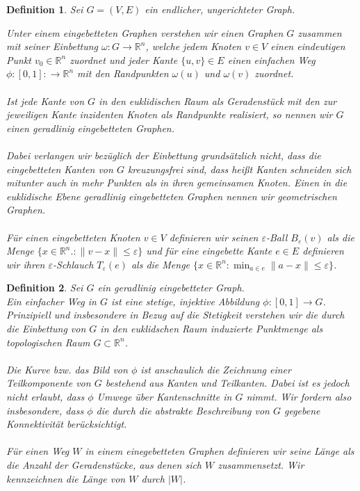 \documentclass[a4paper, 12pt, twoside]{article}
\theoremstyle{Format1} %
\newtheorem{Def}{Definition}[section]       %
\begin{document}
\begin{Def}
	Sei $G=(V,E)$ ein endlicher, ungerichteter Graph.

	Unter einem \textit{eingebetteten Graphen} verstehen wir einen Graphen $G$
	zusammen mit seiner \textit{Einbettung} $\omega: G \to \mathbb{R}^n$, welche
	jedem Knoten $v \in V$ einen eindeutigen Punkt $v_0 \in \mathbb{R}^n$ zuordnet und jeder Kante $\{u,v\} \in E$
	einen einfachen Weg $\phi: [0,1]: \to \mathbb{R}^n$ mit den Randpunkten $\omega(u)$ und $\omega(v)$ zuordnet.
	\\
	\\
	Ist jede Kante von $G$ in den euklidischen Raum als Geradenstück mit den zur jeweiligen Kante inzidenten Knoten als Randpunkte realisiert, so
	nennen wir $G$ einen \textit{geradlinig eingebetteten Graphen}.
	\\
	\\
	Dabei verlangen wir bezüglich der Einbettung grundsätzlich nicht, dass die eingebetteten Kanten von $G$ \textit{kreuzungsfrei} sind,
	dass heißt Kanten schneiden sich mitunter auch in mehr Punkten als in ihren gemeinsamen Knoten.
	Einen in die euklidische Ebene geradlinig eingebetteten Graphen nennen wir \textit{geometrischen Graphen}.
	\\
	\\
	Für einen eingebetteten Knoten $v \in V$ definieren wir seinen \textit{$\varepsilon$-Ball} $B_{\varepsilon}(v)$ als die Menge
	$\{x \in \mathbb{R}^n.: \|v-x\| \leq \varepsilon\}$
	und für eine eingebette Kante $e \in E$ definieren wir ihren \textit{$\varepsilon$-Schlauch} $T_{\varepsilon}(e)$ als die Menge
	$\{x \in \mathbb{R}^n: \min_{a \in e}\|a-x\| \leq \varepsilon\}$.
\end{Def}

\begin{Def}
	Sei $G$ ein geradlinig eingebetteter Graph.
	\\
	Ein \textit{einfacher Weg in $G$} ist eine stetige, injektive Abbildung $\phi: [0,1] \to G$.
	Prinzipiell und insbesondere in Bezug auf die Stetigkeit verstehen wir die durch die Einbettung von
	$G$ in den euklidschen Raum induzierte Punktmenge als topologischen Raum $G \subset \mathbb{R}^n$.
	\\
	\\
	Die Kurve bzw. das Bild von $\phi$ ist anschaulich die Zeichnung einer Teilkomponente von $G$ bestehend aus
	Kanten und Teilkanten. Dabei ist es jedoch nicht erlaubt, dass $\phi$ Umwege über Kantenschnitte in $G$ nimmt.
	Wir fordern also insbesondere, dass $\phi$ die durch die abstrakte Beschreibung von $G$ gegebene Konnektivität berücksichtigt.
	\\
	\\
	Für einen Weg $W$ in einem einegebetteten Graphen definieren wir seine \textit{Länge} als die Anzahl der Geradenstücke, aus
	denen sich $W$ zusammensetzt. Wir kennzeichnen die Länge von $W$ durch $|W|$.
\end{Def}
\end{document}

